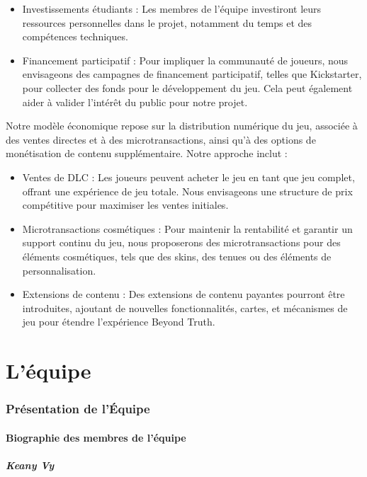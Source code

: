 \documentclass[
	article,			%
	11pt,				%
	oneside,			%
	a4paper,			%
	chapter=TITLE,
	french,			%
	sumario=tradicional
	]{base_nt}
\begin{document}
\begin{itemize}
    \item Investissements étudiants : Les membres de l'équipe investiront leurs ressources personnelles dans le projet, notamment du temps et des compétences techniques.
    \item Financement participatif : Pour impliquer la communauté de joueurs, nous envisageons des campagnes de financement participatif, telles que Kickstarter, pour collecter des fonds pour le développement du jeu. Cela peut également aider à valider l'intérêt du public pour notre projet.
\end{itemize}

Notre modèle économique repose sur la distribution numérique du jeu, associée à des ventes directes et à des microtransactions, ainsi qu'à des options de monétisation de contenu supplémentaire. Notre approche inclut :

\begin{itemize}
    \item Ventes de DLC : Les joueurs peuvent acheter le jeu en tant que jeu complet, offrant une expérience de jeu totale. Nous envisageons une structure de prix compétitive pour maximiser les ventes initiales.
    \item Microtransactions cosmétiques : Pour maintenir la rentabilité et garantir un support continu du jeu, nous proposerons des microtransactions pour des éléments cosmétiques, tels que des skins, des tenues ou des éléments de personnalisation.
    \item Extensions de contenu : Des extensions de contenu payantes pourront être introduites, ajoutant de nouvelles fonctionnalités, cartes, et mécanismes de jeu pour étendre l'expérience Beyond Truth.
\end{itemize}

\part{L'équipe}

\section{Présentation de l'Équipe}

\subsection{Biographie des membres de l'équipe}

\subsubsection{Keany Vy}
\end{document}
